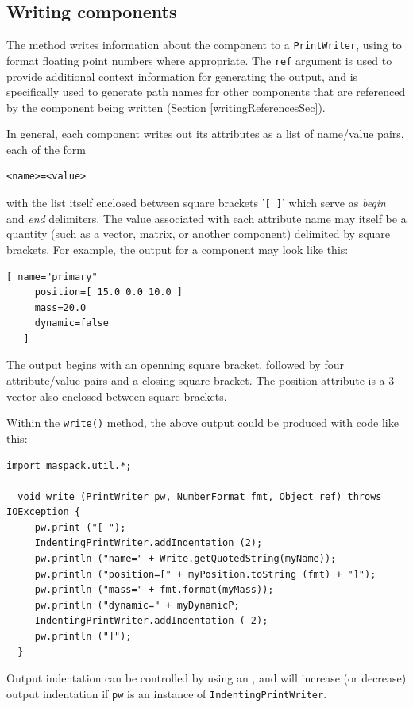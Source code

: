 \documentclass{article}
\begin{document}
\subsection{Writing components}

The  method writes
information about the component to a {\tt PrintWriter}, using
 to format floating point
numbers where appropriate. The {\tt ref} argument is used to provide
additional context information for generating the output, and is
specifically used to generate path names for other components
that are referenced by the component being written
(Section \ref{writingReferencesSec}).

In general, each component writes out its attributes as a list
of name/value pairs, each of the form
\begin{lstlisting}[]
  <name>=<value>
\end{lstlisting}
with the list itself enclosed between square brackets '{\tt [ ]}' which
serve as {\it begin} and {\it end} delimiters. The value associated with each
attribute name may itself be a quantity (such as a vector, matrix, or
another component) delimited by square brackets. For example, the
output for a  component
may look like this:
\begin{lstlisting}[]
   [ name="primary"
     position=[ 15.0 0.0 10.0 ]
     mass=20.0
     dynamic=false
   ]
\end{lstlisting}
The output begins with an openning square bracket, followed by four
attribute/value pairs and a closing square bracket. The position
attribute is a 3-vector also enclosed between square brackets.

Within the {\tt write()} method, the above output could be produced
with code like this:
\begin{lstlisting}[]
  import maspack.util.*;

  void write (PrintWriter pw, NumberFormat fmt, Object ref) throws IOException {
     pw.print ("[ ");
     IndentingPrintWriter.addIndentation (2); 
     pw.println ("name=" + Write.getQuotedString(myName));
     pw.println ("position=[" + myPosition.toString (fmt) + "]");
     pw.println ("mass=" + fmt.format(myMass));
     pw.println ("dynamic=" + myDynamicP;
     IndentingPrintWriter.addIndentation (-2);
     pw.println ("]");
  }
\end{lstlisting}
Output indentation can be controlled by using an
, and
will increase (or decrease) output indentation if
{\tt pw} is an instance of {\tt IndentingPrintWriter}.
\end{document}
